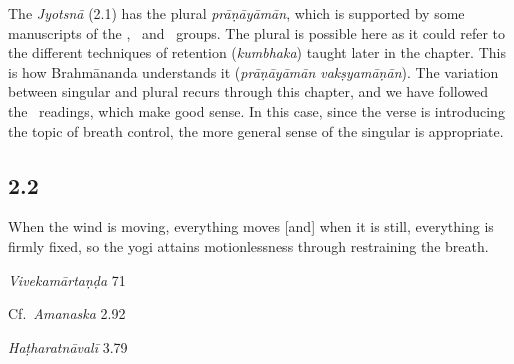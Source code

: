 \begin{ekdosis}
\begin{philcomm}[hp02_001]
The \emph{Jyotsnā} (2.1) has the plural \emph{prāṇāyāmān}, which is supported by some manuscripts of the \textbeta, \textgamma\ and \textzeta\ groups. The plural is possible here as it could refer to the different techniques of retention (\emph{kumbhaka}) taught later in the chapter. This is how Brahmānanda understands it (\emph{prāṇāyāmān vakṣyamāṇān}). The variation between singular and plural recurs through this chapter, and we have followed the \alphaOne\ readings, which make good sense. In this case, since the verse is introducing the topic of breath control, the more general sense of the singular is appropriate.
\end{philcomm}

\subsection*{2.2}
\begin{translation}[hp02_002]
When the wind is moving, everything moves [and] when it is still, everything is firmly fixed, so the yogi attains motionlessness through restraining the breath.
\end{translation}

\begin{sources}[hp02_002]
\emph{Vivekamārtaṇḍa} 71

\begin{versinnote}
\tl{\var{71d vāyunibandhanāt ] VT; vāyuṃ nibaṃdhayet A, vāyuṃ nirundhayet G}\\!}
\end{versinnote}

Cf.~\emph{Amanaska} 2.92

\begin{versinnote}
\end{versinnote}
\end{sources}

\begin{testimonia}[hp02_002]
\emph{Haṭharatnāvalī} 3.79 


\end{testimonia}
\end{ekdosis}

